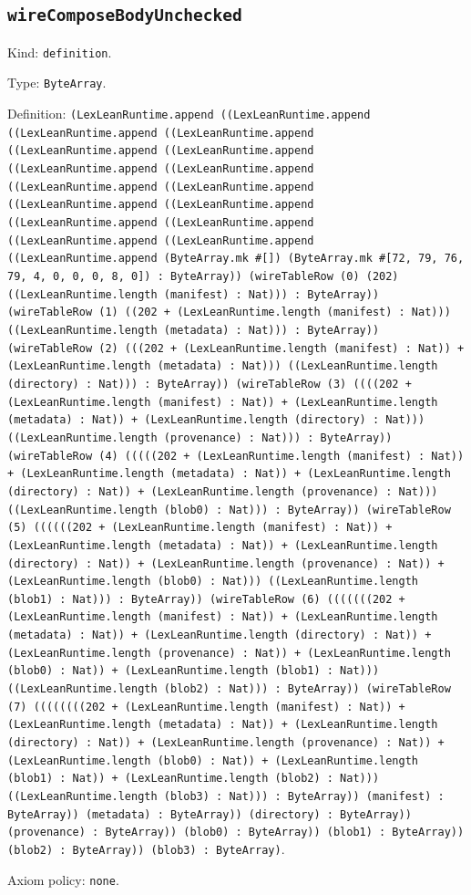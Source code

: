 \documentclass[11pt]{article}
\begin{document}
\subsection*{\texttt{wireComposeBodyUnchecked}}
\noindent Kind: \texttt{definition}.\par
\noindent Type: \texttt{ByteArray}.\par
\noindent Definition: \texttt{(LexLeanRuntime.append ((LexLeanRuntime.append ((LexLeanRuntime.append ((LexLeanRuntime.append ((LexLeanRuntime.append ((LexLeanRuntime.append ((LexLeanRuntime.append ((LexLeanRuntime.append ((LexLeanRuntime.append ((LexLeanRuntime.append ((LexLeanRuntime.append ((LexLeanRuntime.append ((LexLeanRuntime.append ((LexLeanRuntime.append ((LexLeanRuntime.append ((LexLeanRuntime.append ((LexLeanRuntime.append (ByteArray.mk \#[]) (ByteArray.mk \#[72, 79, 76, 79, 4, 0, 0, 0, 8, 0]) : ByteArray)) (wireTableRow (0) (202) ((LexLeanRuntime.length (manifest) : Nat))) : ByteArray)) (wireTableRow (1) ((202 + (LexLeanRuntime.length (manifest) : Nat))) ((LexLeanRuntime.length (metadata) : Nat))) : ByteArray)) (wireTableRow (2) (((202 + (LexLeanRuntime.length (manifest) : Nat)) + (LexLeanRuntime.length (metadata) : Nat))) ((LexLeanRuntime.length (directory) : Nat))) : ByteArray)) (wireTableRow (3) ((((202 + (LexLeanRuntime.length (manifest) : Nat)) + (LexLeanRuntime.length (metadata) : Nat)) + (LexLeanRuntime.length (directory) : Nat))) ((LexLeanRuntime.length (provenance) : Nat))) : ByteArray)) (wireTableRow (4) (((((202 + (LexLeanRuntime.length (manifest) : Nat)) + (LexLeanRuntime.length (metadata) : Nat)) + (LexLeanRuntime.length (directory) : Nat)) + (LexLeanRuntime.length (provenance) : Nat))) ((LexLeanRuntime.length (blob0) : Nat))) : ByteArray)) (wireTableRow (5) ((((((202 + (LexLeanRuntime.length (manifest) : Nat)) + (LexLeanRuntime.length (metadata) : Nat)) + (LexLeanRuntime.length (directory) : Nat)) + (LexLeanRuntime.length (provenance) : Nat)) + (LexLeanRuntime.length (blob0) : Nat))) ((LexLeanRuntime.length (blob1) : Nat))) : ByteArray)) (wireTableRow (6) (((((((202 + (LexLeanRuntime.length (manifest) : Nat)) + (LexLeanRuntime.length (metadata) : Nat)) + (LexLeanRuntime.length (directory) : Nat)) + (LexLeanRuntime.length (provenance) : Nat)) + (LexLeanRuntime.length (blob0) : Nat)) + (LexLeanRuntime.length (blob1) : Nat))) ((LexLeanRuntime.length (blob2) : Nat))) : ByteArray)) (wireTableRow (7) ((((((((202 + (LexLeanRuntime.length (manifest) : Nat)) + (LexLeanRuntime.length (metadata) : Nat)) + (LexLeanRuntime.length (directory) : Nat)) + (LexLeanRuntime.length (provenance) : Nat)) + (LexLeanRuntime.length (blob0) : Nat)) + (LexLeanRuntime.length (blob1) : Nat)) + (LexLeanRuntime.length (blob2) : Nat))) ((LexLeanRuntime.length (blob3) : Nat))) : ByteArray)) (manifest) : ByteArray)) (metadata) : ByteArray)) (directory) : ByteArray)) (provenance) : ByteArray)) (blob0) : ByteArray)) (blob1) : ByteArray)) (blob2) : ByteArray)) (blob3) : ByteArray)}.\par
\noindent Axiom policy: \texttt{none}.\par
\end{document}
